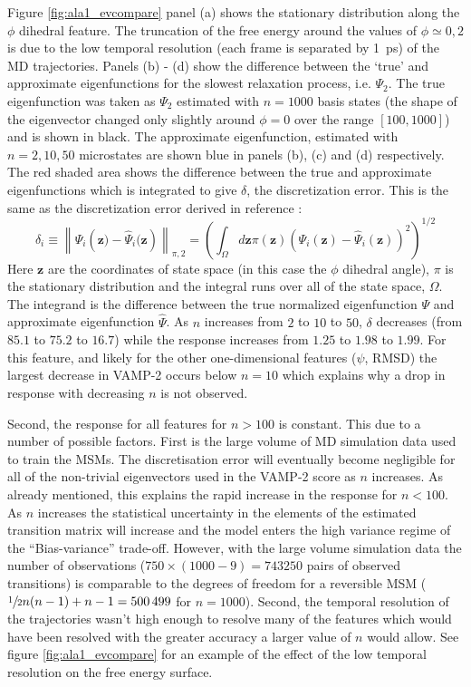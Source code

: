 Figure \ref{fig:ala1_evcompare} panel (a) shows the stationary distribution along the $\phi$ dihedral feature.  The truncation of the free energy around the values of $\phi \simeq 0, 2$ is due to the low temporal resolution (each frame is separated by \SI{1}{\pico\second}) of the MD trajectories.  Panels (b) - (d) show the difference between the `true' and approximate eigenfunctions for the slowest relaxation process, i.e. $\Psi_{2}$. The true eigenfunction was taken as $\Psi_{2}$ estimated with $n=1000$ basis states (the shape of the eigenvector changed only slightly around $\phi=0$ over the range $[100, 1000]$) and is shown in black. The approximate eigenfunction, estimated with $n=2, 10, 50$ microstates are shown blue in panels (b), (c) and (d) respectively. The red shaded area shows the difference between the true and approximate eigenfunctions which is integrated to give $\delta$, the discretization error. This is the same as the discretization error derived in reference \cite{prinzMarkovModelsMolecular2011}:
\begin{equation}
    \delta_{i} \equiv\left\|\Psi_{i}\left(\mathbf{z})-\hat{\Psi}_{i}(\mathbf{z}\right)\right\|_{\pi, 2}=\left(\int_{\Omega} d \mathbf{z} \pi(\mathbf{z})(\Psi_{i}(\mathbf{z})-\hat{\Psi}_{i}(\mathbf{z}))^{2}\right)^{1 / 2}
\end{equation}
Here $\mathbf{z}$ are the coordinates of state space (in this case the $\phi$ dihedral angle), $\pi$ is the stationary distribution and the integral runs over all of the state space, $\Omega$. The integrand is the difference between the true normalized eigenfunction $\Psi$ and approximate eigenfunction $\hat{\Psi}$. As $n$ increases from $2$ to $10$ to $50$, $\delta$ decreases (from $85.1$ to $75.2$ to $16.7$) while the response increases from $1.25$ to $1.98$ to $1.99$. For this feature, and likely for the other one-dimensional features ($\psi$, RMSD) the largest decrease in VAMP-2 occurs below $n=10$ which explains why a drop in response with decreasing $n$ is not observed. 

Second, the response for all features for $n > 100$ is constant. This due to a number of possible factors. First is the large volume of MD simulation data used to train the MSMs. The discretisation error will eventually become negligible for all of the  non-trivial eigenvectors used in the VAMP-2 score as $n$ increases. As already mentioned, this explains the rapid increase in the response for $n<100$. As $n$ increases the statistical uncertainty in the elements of the estimated transition matrix will increase and the model enters the high variance regime of the ``Bias-variance'' trade-off.  However, with the large volume simulation data the number of observations ($750\times(1000-9) = \num{743250}$ pairs of observed transitions) is comparable to the degrees of freedom for a reversible MSM\cite{trendelkamp-schroerEstimationUncertaintyReversible2015b} ($\sfrac{1}{2}n(n-1)+n-1=\num{500499}$ for $n=1000$). Second, the temporal resolution of the trajectories wasn't high enough to resolve many of the features which would have been resolved with the greater accuracy a larger value of $n$ would allow. See figure \ref{fig:ala1_evcompare} for an example of the effect of the low temporal resolution on the free energy surface. 

